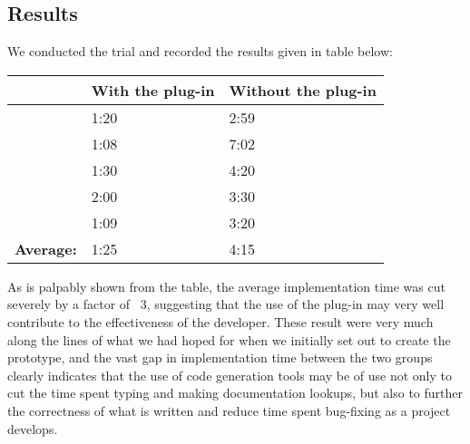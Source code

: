 \subsection{Results}
\label{Results}
We conducted the trial and recorded the results given in table below:

\begin{center}
\begin{tabular}{|l|l|l|}
    \hline
    ~        & {\bf With the plug-in} & {\bf Without the plug-in} \\ \hline
    ~        & 1:20             & 2:59                \\ \hline
    ~        & 1:08             & 7:02                \\ \hline
    ~        & 1:30             & 4:20                \\ \hline
    ~        & 2:00             & 3:30                \\ \hline
    ~        & 1:09             & 3:20                   \\ \hline
    {\bf Average:} & 1:25             & 4:15                \\ \hline
\end{tabular}
\end{center}

As is palpably shown from the table, the average implementation time was cut severely by a factor of ~3, suggesting that the use of the plug-in may very well contribute to the effectiveness of the developer. These result were very much along the lines of what we had hoped for when we initially set out to create the prototype, and the vast gap in implementation time between the two groups clearly indicates that the use of code generation tools may be of use not only to cut the time spent typing and making documentation lookups, but also to further the correctness of what is written and reduce time spent bug-fixing as a project develops.








